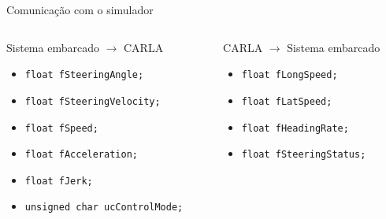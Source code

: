 \documentclass{if-beamer}
\begin{document}
\begin{frame}{Comunicação com o simulador}
	
	\begin{columns}
		
		\begin{column}{0.435\textwidth}
			
			\begin{block}{Sistema embarcado $\longrightarrow$ CARLA}
				
				\begin{itemize}
					\item \texttt{float fSteeringAngle;}
					\item \texttt{float fSteeringVelocity;}
					\item \texttt{float fSpeed;}
					\item \texttt{float fAcceleration;}
					\item \texttt{float fJerk;}	
					\item \texttt{unsigned char ucControlMode;}					
				\end{itemize}
				
			\end{block}
			
		\end{column}
	
\pause
		
		\begin{column}{0.435\textwidth}
			
			\begin{block}{CARLA $\longrightarrow$ Sistema embarcado }
				
				\begin{itemize}
					\item \texttt{float fLongSpeed;}
					\item \texttt{float fLatSpeed;}
					\item \texttt{float fHeadingRate;}
					\item \texttt{float fSteeringStatus;}
					
				\end{itemize}
				
				
				
			\end{block}
			
		\end{column}
		
	\end{columns}

\pause
	
	\begin{block}{}
		

\end{block}
\end{frame}
\end{document}
